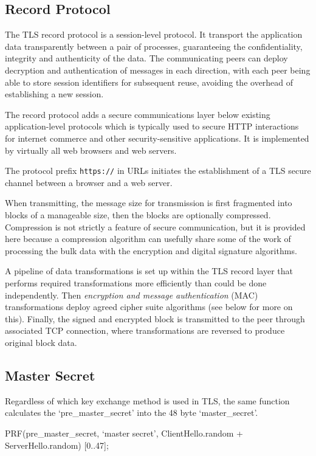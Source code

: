 \subsection{Record Protocol}
The TLS record protocol is a session-level protocol. It transport the application data transparently between a pair of processes, guaranteeing the confidentiality, integrity and authenticity of the data. The communicating peers can deploy decryption and authentication of messages in each direction, with each peer being able to store session identifiers for subsequent reuse, avoiding the overhead of establishing a new session.

The record protocol adds a secure communications layer below existing application-level protocols which is typically used to secure HTTP interactions for internet commerce and other security-sensitive applications. It is implemented by virtually all web browsers and web servers.

The protocol prefix \verb|https://| in URLs initiates the establishment of a TLS secure channel between a browser and a web server.

When transmitting, the message size for transmission is first fragmented into blocks of a manageable size, then the blocks are optionally compressed. Compression is not strictly a feature of secure communication, but it is provided here because a compression algorithm can usefully share some of the work of processing the bulk data with the encryption and digital signature algorithms. 

A pipeline of data transformations is set up within the TLS record layer that performs required transformations more efficiently than could be done independently. Then \textit{encryption and message authentication} (MAC) transformations deploy agreed cipher suite algorithms (see below for more on this). Finally, the signed and encrypted block is transmitted to the peer through associated TCP connection, where transformations are reversed to produce original block data. 

\subsection{Master Secret}
Regardless of which key exchange method is used in TLS, the same function calculates the `pre\_master\_secret' into the 48 byte `master\_secret'. 
\begin{center}
PRF(pre\_master\_secret, `master secret', ClientHello.random + ServerHello.random) [0..47];
\end{center}

